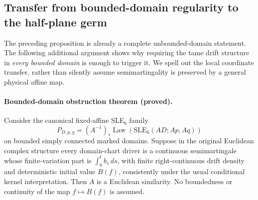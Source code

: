 \documentclass[11pt]{article}
\theoremstyle{definition}\newtheorem{definition}[theorem]{Definition}
\theoremstyle{remark}\newtheorem{remark}[theorem]{Remark}
\begin{document}
\subsection{Transfer from bounded-domain regularity to the half-plane germ}

The preceding proposition is already a complete unbounded-domain statement.
The following additional argument shows why requiring the tame drift
structure in \emph{every bounded domain} is enough to trigger it.
We spell out the local coordinate transfer, rather than silently assume
semimartingality is preserved by a general physical affine map.

\paragraph{Bounded-domain obstruction theorem (proved).}
Consider the canonical fixed-affine SLE$_6$ family
\[
 P_{D,p,q}=(A^{-1})_*\operatorname{Law}
       (\mathrm{SLE}_6(AD;Ap,Aq))
\]
on bounded simply connected marked domains.  Suppose in the original
Euclidean complex structure every domain-chart driver is a continuous
semimartingale whose finite-variation part is
$\int_0^t b_s\,ds$, with finite right-continuous drift density and
deterministic initial value $B(f)$, consistently under the usual conditional
kernel interpretation.  Then $A$ is a Euclidean similarity.
No boundedness or continuity of the map $f\mapsto B(f)$ is assumed.
\end{document}
